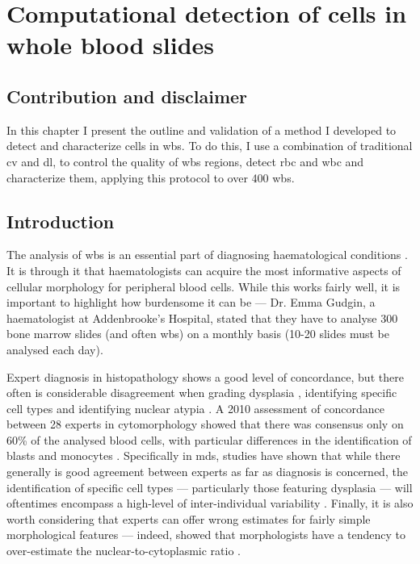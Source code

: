 \chapter{Computational detection of cells in whole blood slides}

\section{Contribution and disclaimer}

In this chapter I present the outline and validation of a method I developed to detect and characterize cells in \ac{wbs}. To do this, I use a combination of traditional \ac{cv} and \ac{dl}, to control the quality of \ac{wbs} regions, detect \ac{rbc} and \ac{wbc} and characterize them, applying this protocol to over 400 \ac{wbs}. 

\section{Introduction}

The analysis of \ac{wbs} is an essential part of diagnosing haematological conditions \cite{Bain2014-oc}. It is through it that haematologists can acquire the most informative aspects of cellular morphology for peripheral blood cells. While this works fairly well, it is important to highlight how burdensome it can be --- Dr. Emma Gudgin, a haematologist at Addenbrooke's Hospital, stated that they have to analyse 300 bone marrow slides (and often \ac{wbs}) on a monthly basis (10-20 slides must be analysed each day).

Expert diagnosis in histopathology shows a good level of concordance, but there often is considerable disagreement when grading dysplasia \cite{Azam2021-su}, identifying specific cell types \cite{Goasguen2009-dn,Foucar2020-uz} and identifying nuclear atypia \cite{Azam2021-su,Weinberg2015-ra}. A 2010 assessment of concordance between 28 experts in cytomorphology showed that there was consensus only on 60\% of the analysed blood cells, with particular differences in the identification of blasts and monocytes \cite{Zini2010-kg}. Specifically in \ac{mds}, studies have shown that while there generally is good agreement between experts as far as diagnosis is concerned, the identification of specific cell types --- particularly those featuring dysplasia --- will oftentimes encompass a high-level of inter-individual variability \cite{De_Swart2017-wc,Howe2004-mn}. Finally, it is also worth considering that experts can offer wrong estimates for fairly simple morphological features --- indeed,  showed that morphologists have a tendency to over-estimate the nuclear-to-cytoplasmic ratio \cite{Zhang2016-sv}.


